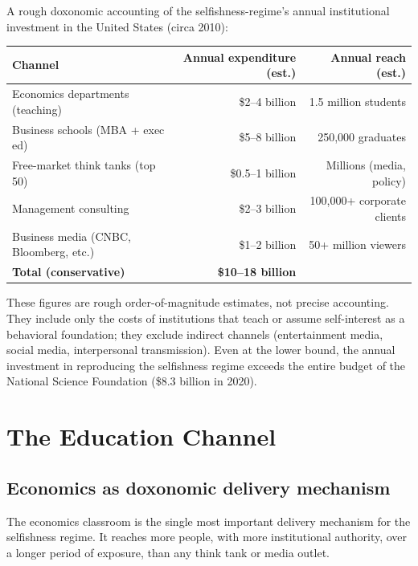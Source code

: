 \begin{example}
\label{ex:funding-estimate}
A rough doxonomic accounting of the selfishness-regime's annual institutional investment in the United States (circa 2010):

\begin{center}
\begin{tabular}{lrr}
\toprule
Channel & Annual expenditure (est.) & Annual reach (est.) \\
\midrule
Economics departments (teaching) & \$2--4 billion & 1.5 million students \\
Business schools (MBA + exec ed) & \$5--8 billion & 250,000 graduates \\
Free-market think tanks (top 50) & \$0.5--1 billion & Millions (media, policy) \\
Management consulting & \$2--3 billion & 100,000+ corporate clients \\
Business media (CNBC, Bloomberg, etc.) & \$1--2 billion & 50+ million viewers \\
\midrule
\textbf{Total (conservative)} & \textbf{\$10--18 billion} & \\
\bottomrule
\end{tabular}
\end{center}

These figures are rough order-of-magnitude estimates, not precise accounting.
They include only the costs of institutions that teach or assume self-interest as a behavioral foundation; they exclude indirect channels (entertainment media, social media, interpersonal transmission).
Even at the lower bound, the annual investment in reproducing the selfishness regime exceeds the entire budget of the National Science Foundation (\$8.3 billion in 2020).
\end{example}

\section{The Education Channel}
\label{sec:ch21-education}

\subsection{Economics as doxonomic delivery mechanism}

The economics classroom is the single most important delivery mechanism for the selfishness regime.
It reaches more people, with more institutional authority, over a longer period of exposure, than any think tank or media outlet.

